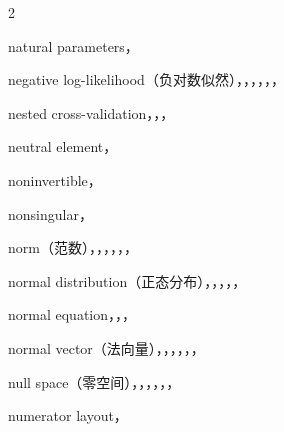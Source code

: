 \begin{multicols}{2}
\medskip{}\par\smallskip
\noindent natural parameters，\par
\noindent negative log-likelihood（负对数似然），，，，，，\par
\noindent nested cross-validation，，，\par
\noindent neutral element，\par
\noindent noninvertible，\par
\noindent nonsingular，\par
\noindent norm（范数），，，，，，\par
\noindent normal distribution（正态分布），，，，，\par
\noindent normal equation，，，\par
\noindent normal vector（法向量），，，，，，\par
\noindent null space（零空间），，，，，，\par
\noindent numerator layout，\par


\end{multicols}
